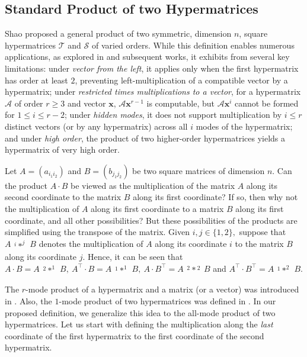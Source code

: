 \documentclass[10pt,a4paper]{article}
\begin{document}
	
	
	\subsection{Standard Product of two Hypermatrices}
	
	Shao \cite{shao2013general} proposed a general product of two symmetric, dimension $n$, square hypermatrices $\mathcal{T}$ and $\mathcal{S}$ of varied orders. While this definition enables numerous applications, as explored in \cite{shao2013general} and subsequent works, it exhibits from several key limitations: under \emph{vector from the left}, it applies only when the first hypermatrix has order at least $2$, preventing left-multiplication of a compatible vector by a hypermatrix; under \emph{restricted times multiplications to a vector}, for a hypermatrix $\mathcal{A}$ of order $r \geq 3$ and vector $\mathbf{x}$, $\mathcal{A} \mathbf{x}^{r-1}$ is computable, but $\mathcal{A} \mathbf{x}^i$ cannot be formed for $1 \leq i \leq r-2$; under \emph{hidden modes}, it does not support multiplication by $i \leq r$ distinct vectors (or by any hypermatrix) across all $i$ modes of the hypermatrix; and under \emph{high order}, the product of two higher-order  hypermatrices yields a hypermatrix of very  high order.
	
	Let $A=(a_{i_1i_2})$ and $B=(b_{j_1j_2})$ be two square matrices of dimension $n$. 
	Can the product $A\cdot B$ be viewed as the multiplication of the matrix $A$ along its second coordinate to the matrix $B$ along its first coordinate? If so, then why not the multiplication of $A$ along its first coordinate to a matrix $B$ along its first coordinate, and all other possibilities? But these possibilities of the products are simplified using the transpose of the matrix. 
	Given $i, j \in \{ 1,2 \},$ suppose that $A \substack{^i * ^j} B$ denotes the multiplication of $A$ along its coordinate $i$ to the matrix $B$ along its coordinate $j$.
	Hence, it can be seen that $A\cdot B= A \substack{^2 * ^1} B,~ A^\intercal \cdot B = A \substack{^1 * ^1} B, ~ A\cdot B^\intercal= A \substack{{^2} * {^2}} B $ and $A^\intercal\cdot B^\intercal= A \substack{^1 * ^2} B.$
	
	The $r$-mode product of a hypermatrix and a matrix (or a vector) was introduced in \cite{bader2006algorithm}. Also, the $1$-mode product of two hypermatrices was defined in \cite{comon2002tensor}. In our proposed definition, we generalize this idea to the all-mode product of two hypermatrices. Let us start with defining the multiplication along the \emph{last} coordinate of the first hypermatrix to the first coordinate of the second hypermatrix.
	
\end{document}
